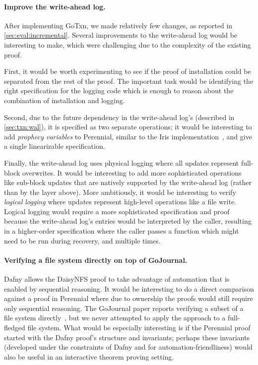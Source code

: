 \paragraph{Improve the write-ahead log.} After implementing GoTxn, we made
relatively few changes, as reported in \cref{sec:eval:incremental}. Several
improvements to the write-ahead log would be interesting to make, which were
challenging due to the complexity of the existing proof.

First, it would be worth experimenting to see if the proof of installation could
be separated from the rest of the proof. The important task would be identifying
the right specification for the logging code which is enough to reason about the
combination of installation and logging.

Second, due to the future dependency in the write-ahead log's 
(described in \cref{sec:txn:wal}), it is specified as two separate
operations; it would be interesting to add \emph{prophecy variables} to
Perennial, similar to the Iris implementation~\cite{jung:prophecy}, and give
 a single linearizable specification.

Finally, the write-ahead log uses physical logging where all updates represent
full-block overwrites. It would be interesting to add more sophisticated
operations like sub-block updates that are natively supported by the write-ahead
log (rather than by the layer above). More ambitiously, it would be interesting
to verify \emph{logical logging} where updates represent high-level operations
like a file write. Logical logging would require a more sophisticated
specification and proof because the write-ahead log's entries would be
interpreted by the caller, resulting in a higher-order specification where the
caller passes a function which might need to be run during recovery, and
multiple times.

\paragraph{Verifying a file system directly on top of GoJournal.} Dafny allows
the DaisyNFS proof to take advantage of automation that is enabled by sequential
reasoning. It would be interesting to do a direct comparison against a proof in
Perennial where due to ownership the proofs would still require only sequential
reasoning. The GoJournal paper reports verifying a subset of a file system
directly~\cite{chajed:gojournal}, but we never attempted to apply the approach
to a full-fledged file system. What would be especially interesting is if the
Perennial proof started with the Dafny proof's structure and invariants; perhaps
these invariants (developed under the constraints of Dafny and for
automation-friendliness) would also be useful in an interactive theorem proving
setting.

